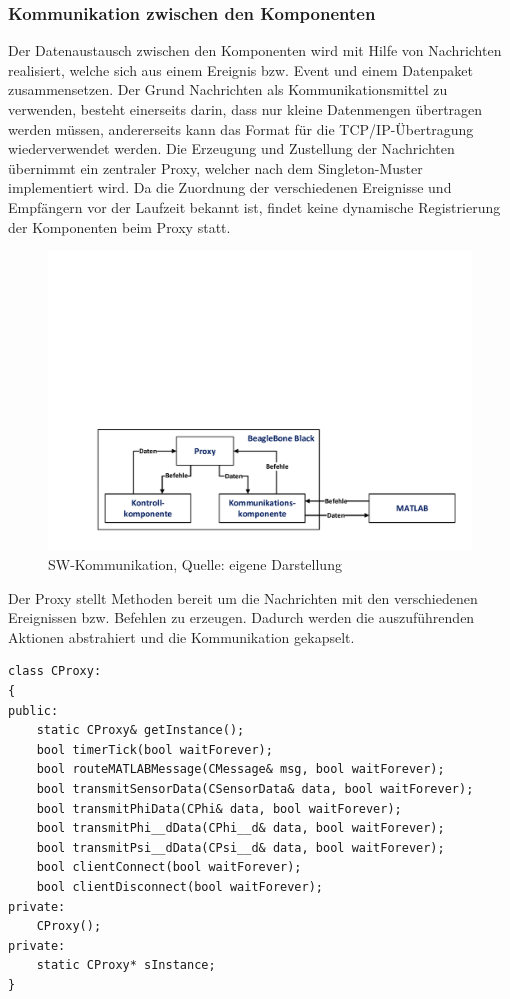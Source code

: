 \subsubsection{Kommunikation zwischen den Komponenten}
Der Datenaustausch zwischen den Komponenten wird mit Hilfe von Nachrichten realisiert, welche sich aus einem Ereignis bzw. Event und einem Datenpaket zusammensetzen. Der Grund Nachrichten als Kommunikationsmittel zu verwenden, besteht einerseits darin, dass nur kleine Datenmengen übertragen werden müssen, andererseits kann das Format für die TCP/IP-Übertragung wiederverwendet werden. Die Erzeugung und Zustellung der Nachrichten übernimmt ein zentraler Proxy, welcher nach dem Singleton-Muster implementiert wird. Da die Zuordnung der verschiedenen Ereignisse und Empfängern vor der Laufzeit bekannt ist, findet keine dynamische Registrierung der Komponenten beim Proxy statt.
 
\begin{figure}[!h]
\centering
\includegraphics[width=0.8\linewidth, trim={2cm 1cm 1cm 12.5cm},clip]{img/SW_kommunikation}
\caption{SW-Kommunikation, Quelle: eigene Darstellung}
\label{img_kommunikation_sw}
\end{figure}

Der Proxy stellt Methoden bereit um die Nachrichten mit den verschiedenen Ereignissen bzw. Befehlen zu erzeugen. Dadurch werden die auszuführenden Aktionen abstrahiert und die Kommunikation gekapselt.

\begin{lstlisting}
class CProxy:
{
public:
	static CProxy& getInstance();
	bool timerTick(bool waitForever);
	bool routeMATLABMessage(CMessage& msg, bool waitForever);
	bool transmitSensorData(CSensorData& data, bool waitForever);
	bool transmitPhiData(CPhi& data, bool waitForever);
	bool transmitPhi__dData(CPhi__d& data, bool waitForever);
	bool transmitPsi__dData(CPsi__d& data, bool waitForever);
	bool clientConnect(bool waitForever);
	bool clientDisconnect(bool waitForever);
private:
	CProxy();
private:
	static CProxy* sInstance;
}
\end{lstlisting}

